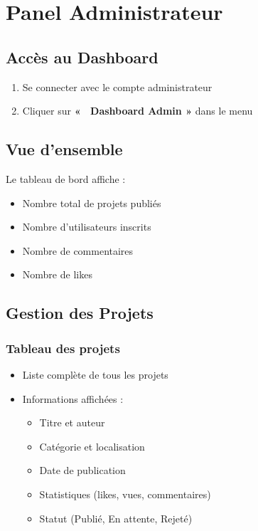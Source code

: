 \documentclass[12pt,a4paper]{article}
\begin{document}
\newpage
\section{Panel Administrateur}

\subsection{Accès au Dashboard}

\begin{enumerate}[leftmargin=*]
    \item Se connecter avec le compte administrateur
    \item Cliquer sur \textbf{« \faUserShield\ Dashboard Admin »} dans le menu
\end{enumerate}

\subsection{Vue d'ensemble}

Le tableau de bord affiche :

\begin{tcolorbox}[colback=primarycolor!10, colframe=primarycolor, title=\faChartLine\ Statistiques Globales]
\begin{itemize}[leftmargin=*]
    \item Nombre total de projets publiés
    \item Nombre d'utilisateurs inscrits
    \item Nombre de commentaires
    \item Nombre de likes
\end{itemize}
\end{tcolorbox}

\subsection{Gestion des Projets}

\subsubsection{Tableau des projets}
\begin{itemize}[leftmargin=*]
    \item Liste complète de tous les projets
    \item Informations affichées :
    \begin{itemize}
        \item Titre et auteur
        \item Catégorie et localisation
        \item Date de publication
        \item Statistiques (likes, vues, commentaires)
        \item Statut (Publié, En attente, Rejeté)
    \end{itemize}
\end{itemize}
\end{document}
